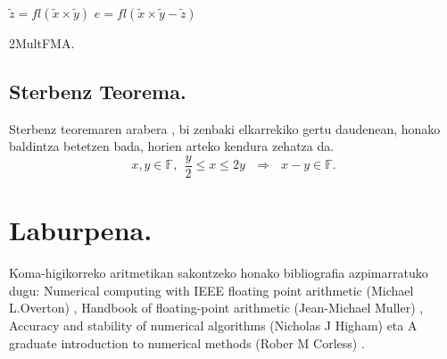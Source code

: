 \begin{algorithm}[H]
 \BlankLine
 {$\tilde{z}=fl(\tilde{x}\times\tilde{y})$\;
  $e=fl(\tilde{x}\times\tilde{y}- \tilde{z})$\;
 }
 \BlankLine
 \caption{2MultFMA.}
 \label{alg:2MultFMA}
\end{algorithm}

\subsection*{Sterbenz Teorema.}
Sterbenz teoremaren arabera \cite{Sterbenz1973}, bi zenbaki elkarrekiko  gertu daudenean, honako baldintza betetzen bada, horien arteko kendura zehatza da.
\begin{equation}
\label{eq:4311}
x,y \in \mathbb{F}, \ \ \frac{y}{2}\leq x \leq 2y \ \ \ \Rightarrow \ \ \ x-y\in \mathbb{F}.
\end{equation}


\section{Laburpena.}

Koma-higikorreko aritmetikan sakontzeko honako bibliografia azpimarratuko dugu: Numerical computing with IEEE floating point arithmetic (Michael L.Overton) \cite{Overton2001}, Handbook of floating-point arithmetic (Jean-Michael Muller) \cite{Muller2009}, Accuracy and stability of numerical algorithms (Nicholas J Higham) \cite{Higham2002} eta A graduate introduction to numerical methods (Rober M Corless) \cite{Corless2013}.

